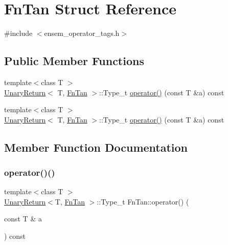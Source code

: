 \hypertarget{structFnTan}{}\section{Fn\+Tan Struct Reference}
\label{structFnTan}


{\ttfamily \#include $<$ensem\+\_\+operator\+\_\+tags.\+h$>$}

\subsection*{Public Member Functions}
\begin{DoxyCompactItemize}
\item 
{\footnotesize template$<$class T $>$ }\\\mbox{\hyperlink{structUnaryReturn}{Unary\+Return}}$<$ T, \mbox{\hyperlink{structFnTan}{Fn\+Tan}} $>$\+::Type\+\_\+t \mbox{\hyperlink{structFnTan_a067d849927778152282097f8efe5cdf1}{operator()}} (const T \&a) const
\item 
{\footnotesize template$<$class T $>$ }\\\mbox{\hyperlink{structUnaryReturn}{Unary\+Return}}$<$ T, \mbox{\hyperlink{structFnTan}{Fn\+Tan}} $>$\+::Type\+\_\+t \mbox{\hyperlink{structFnTan_a067d849927778152282097f8efe5cdf1}{operator()}} (const T \&a) const
\end{DoxyCompactItemize}


\subsection{Member Function Documentation}
\mbox{\label{structFnTan_a067d849927778152282097f8efe5cdf1}} 
\subsubsection{\texorpdfstring{operator()()}{operator()()}\hspace{0.1cm}{\footnotesize\ttfamily [1/2]}}
{\footnotesize\ttfamily template$<$class T $>$ \\
\mbox{\hyperlink{structUnaryReturn}{Unary\+Return}}$<$T, \mbox{\hyperlink{structFnTan}{Fn\+Tan}} $>$\+::Type\+\_\+t Fn\+Tan\+::operator() (\begin{DoxyParamCaption}\item[{const T \&}]{a }\end{DoxyParamCaption}) const\hspace{0.3cm}{\ttfamily [inline]}}

